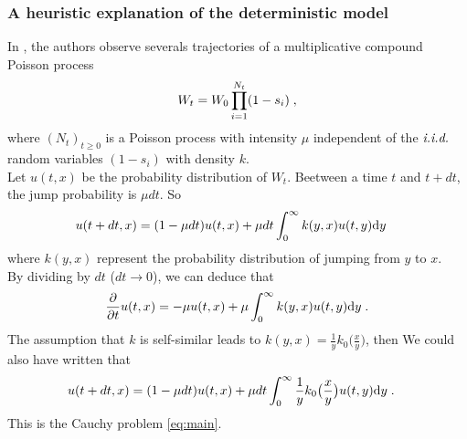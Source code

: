 \documentclass[11pt]{amsart}
\begin{document}
   \subsubsection{A heuristic explanation of the deterministic model} In \cite{robert2018mutation}, the authors observe severals trajectories of a multiplicative compound Poisson process 
   \begin{equation*}
   W_t =W_0 \prod_{i = 1}^{N_t}(1 - s_i) 
   \; ,
   \end{equation*}
   where $(N_t)_{t \geq 0}$ is a Poisson process with intensity $\mu$ independent of the $\textit{i.i.d.}$ random variables $(1-s_i)$ with density $k$. \\
   Let $u(t,x)$ be the probability distribution of $W_t$. Beetween a time $t$ and $t + dt$, the jump probability is $\mu dt$. So
   \begin{align*}
       u(t + dt,x) 
       &= (1  - \mu dt) u(t,x) + \mu dt \int_0^\infty k(y,x) u (t, y) \mathrm dy
   \end{align*}
   where $k(y,x)$ represent the probability distribution of jumping from $y$ to $x$. \\
   By dividing by $dt$ ($dt \to 0$), we can deduce that
   \begin{equation*}
       \frac{\partial}{\partial t} u(t,x) 
       =   - \mu u(t,x) + \mu \int_0^\infty k(y,x) u (t, y) \mathrm dy  
       \; .
   \end{equation*}
   The assumption that $k$ is self-similar leads to $k(y,x) = \frac{1}{y}k_0\big(\frac{x}{y}\big)$, then 
   We could also have written that 
   \begin{align*}
       u(t + dt,x) 
       &= (1  - \mu dt) u(t,x) + \mu dt \int_0^\infty \frac{1}{y}k_0\big(\frac{x}{y}\big) u (t, y) \mathrm dy
       \; .
   \end{align*}
   This is the Cauchy problem \eqref{eq:main}.    
\end{document}
